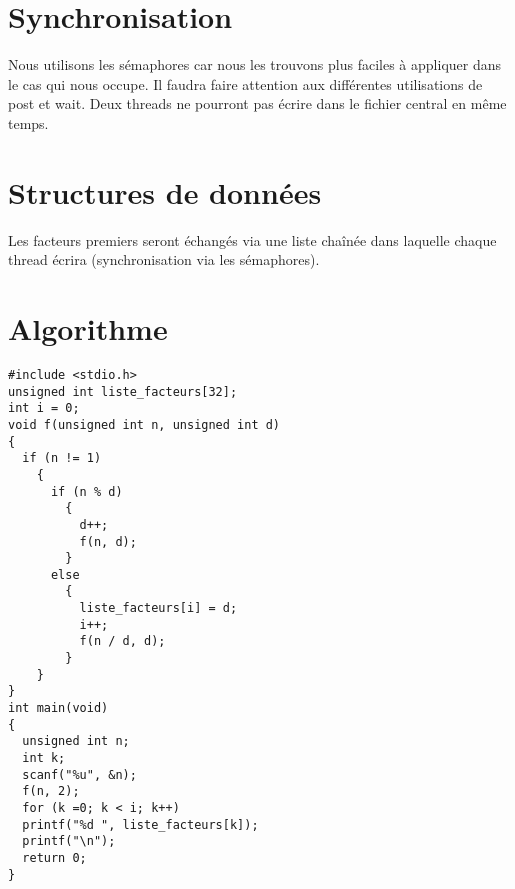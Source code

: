 \documentclass[11pt,a4paper]{article}
\begin{document}
\section{Synchronisation}
Nous utilisons les sémaphores car nous les trouvons plus faciles à appliquer dans le cas qui nous occupe. Il faudra faire attention aux différentes utilisations de post et wait. Deux threads ne pourront pas écrire dans le fichier central en même temps.
\section{Structures de données}
Les facteurs premiers seront échangés via une liste chaînée dans laquelle chaque thread écrira (synchronisation via les sémaphores). 
\section{Algorithme}
\begin{lstlisting}
#include <stdio.h>
unsigned int liste_facteurs[32];
int i = 0;
void f(unsigned int n, unsigned int d)
{
  if (n != 1)
    {
      if (n % d)
        {
          d++;
          f(n, d);
        }
      else
        {
          liste_facteurs[i] = d;
          i++;
          f(n / d, d);
        }
    }
}
int main(void)
{
  unsigned int n;
  int k;
  scanf("%u", &n);
  f(n, 2);
  for (k =0; k < i; k++)
  printf("%d ", liste_facteurs[k]);
  printf("\n");
  return 0;
}
\end{lstlisting}
\end{document}
